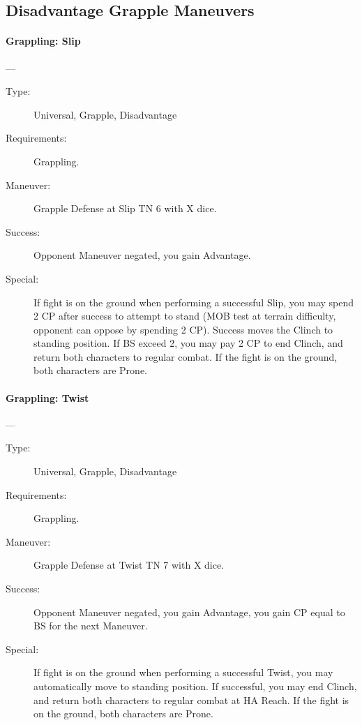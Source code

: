 \documentclass[oneside,11pt,english]{book}
\begin{document}
\subsection{Disadvantage Grapple Maneuvers}
\paragraph{\large\label{man:Grappling: Slip}Grappling: Slip}---\quad{\large[X]}
\vspace{-10pt}\begin{description} 
\item [Type:] Universal, Grapple, Disadvantage 
\item [Requirements:] Grappling. 
\item [Maneuver:] Grapple Defense at Slip TN 6 with X dice. 
\item [Success:] Opponent Maneuver negated, you gain Advantage. 
\item [Special:] If fight is on the ground when performing a successful Slip, you may spend 2 CP after success to 
attempt to stand (MOB test at terrain difficulty, opponent can oppose by spending 2 CP). Success moves 
the Clinch to standing position. 
If BS exceed 2, you may pay 2 CP to end Clinch, and return both characters to regular combat. If the fight 
is on the ground, both characters are Prone. 
\end{description}

\paragraph{\large\label{man:Grappling: Twist}Grappling: Twist}---\quad{\large[X]}
\vspace{-10pt}\begin{description} 
\item [Type:] Universal, Grapple, Disadvantage 
\item [Requirements:] Grappling. 
\item [Maneuver:] Grapple Defense at Twist TN 7 with X dice. 
\item [Success:] Opponent Maneuver negated, you gain Advantage, you gain CP equal to BS for the next 
Maneuver. 
\item [Special:] If fight is on the ground when performing a successful Twist, you may automatically move to 
standing position. 
If successful, you may end Clinch, and return both characters to regular combat at HA Reach. If the fight 
is on the ground, both characters are Prone. 
\end{description}
\end{document}
